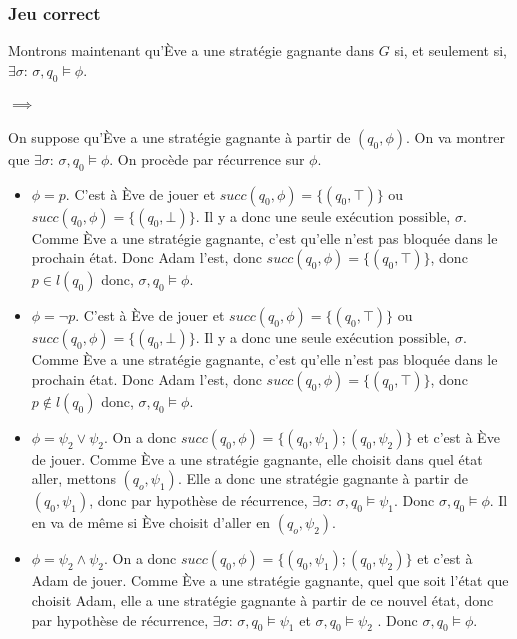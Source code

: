 \documentclass[10pt,a4paper]{article}
\begin{document}
\subsubsection{Jeu correct}
Montrons maintenant qu'Ève a une stratégie gagnante dans $G$ si, et seulement si, $\exists \sigma$: $\sigma,q_0 \vDash \phi$.

\paragraph{$\implies$}
On suppose qu'Ève a une stratégie gagnante à partir de $(q_0, \phi)$. On va montrer que $\exists \sigma$: $\sigma,q_0 \vDash \phi$. On procède par récurrence sur $\phi$.

\begin{itemize}
\item $\phi = p$. C'est à Ève de jouer et $succ(q_0,\phi) = \{(q_0, \top)\}$ ou $succ(q_0,\phi) = \{(q_0, \bot)\}$. Il y a donc une seule exécution possible, $\sigma$. Comme Ève a une stratégie gagnante, c'est qu'elle n'est pas bloquée dans le prochain état. Donc Adam l'est, donc $succ(q_0,\phi) = \{(q_0, \top)\}$, donc $p \in l(q_0)$ donc, $\sigma,q_0 \vDash \phi$.

\item $\phi = \neg p$. C'est à Ève de jouer et $succ(q_0,\phi) = \{(q_0, \top)\}$ ou $succ(q_0,\phi) = \{(q_0, \bot)\}$. Il y a donc une seule exécution possible, $\sigma$. Comme Ève a une stratégie gagnante, c'est qu'elle n'est pas bloquée dans le prochain état. Donc Adam l'est, donc $succ(q_0,\phi) = \{(q_0, \top)\}$, donc $p \notin l(q_0)$ donc, $\sigma,q_0 \vDash \phi$.

\item $\phi = \psi_2 \lor \psi_2$. On a donc $succ(q_0,\phi) = \{(q_0, \psi_1); (q_0, \psi_2) \}$ et c'est à Ève de jouer. Comme Ève a une stratégie gagnante, elle choisit dans quel état aller, mettons $(q_o, \psi_1)$. Elle a donc une stratégie gagnante à partir de $(q_0, \psi_1)$, donc par hypothèse de récurrence, $\exists \sigma$: $\sigma,q_0 \vDash \psi_1$. Donc $\sigma,q_0 \vDash \phi$. Il en va de même si Ève choisit d'aller en $(q_o, \psi_2)$.

\item $\phi = \psi_2 \land \psi_2$. On a donc $succ(q_0,\phi) = \{(q_0, \psi_1); (q_0, \psi_2) \}$ et c'est à Adam de jouer. Comme Ève a une stratégie gagnante, quel que soit l'état que choisit Adam, elle a une stratégie gagnante à partir de ce nouvel état, donc par hypothèse de récurrence, $\exists \sigma$: $\sigma,q_0 \vDash \psi_1$ et $\sigma,q_0 \vDash \psi_2$ . Donc $\sigma,q_0 \vDash \phi$.


\end{itemize}
\end{document}
